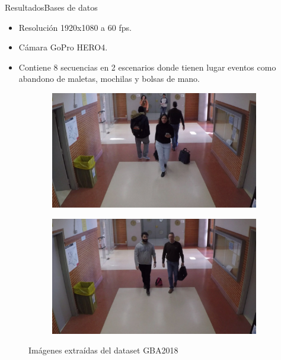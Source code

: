 
\begin{frame}{Resultados}{Bases de datos}

\begin{itemize}
    \justifying
    \item Resolución 1920x1080 a 60 fps.
    \item Cámara GoPro HERO4.
    \item Contiene 8 secuencias en 2 escenarios donde tienen lugar eventos como abandono de maletas, mochilas y bolsas de mano.
\end{itemize}

\vspace{0.1cm}

\begin{figure}[ht]
  \centering
  \begin{subfigure}[b]{0.4\textwidth}
    \includegraphics[width=\textwidth]{Images/resultados/datasets/GBA_3.jpg}
    \caption{}
    \label{fig:GBA_3}
  \end{subfigure}
  \qquad
  \begin{subfigure}[b]{0.4\textwidth}
    \includegraphics[width=\textwidth]{Images/resultados/datasets/GBA_4.jpg}
    \caption{}
    \label{fig:GBA_4}
  \end{subfigure}
  \caption{Imágenes extraídas del dataset GBA2018}
  \label{fig:GBA2018}
\end{figure}
    
\end{frame}

